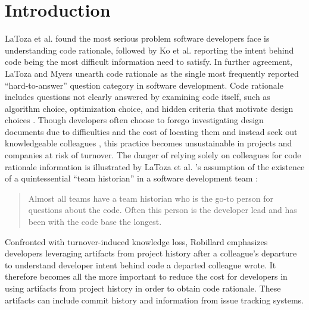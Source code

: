 
\chapter{Introduction}
\label{ch:Introduction}


LaToza et al. \cite{latoza_maintaining_2006} found the most serious problem software developers face is understanding code rationale, followed by Ko et al. \cite{ko_information_2007} reporting the intent behind code being the most difficult information need to satisfy. 
In further agreement, LaToza and Myers \cite{latoza_hard-answer_2010} unearth code rationale as the single most frequently reported “hard-to-answer” question category in software development. 
Code rationale includes questions not clearly answered by examining code itself, such as algorithm choice, optimization choice, and hidden criteria that motivate design choices \cite{latoza_hard-answer_2010}. 
Though developers often choose to forego investigating design documents due to difficulties and the cost of locating them and instead seek out knowledgeable colleagues \cite{latoza_maintaining_2006}, this practice becomes unsustainable in projects and companies at risk of turnover. 
The danger of relying solely on colleagues for code rationale information is illustrated by LaToza et al. 's assumption of the existence of a quintessential ``team historian'' in a software development team \cite{latoza_maintaining_2006}:

\begin{quote}
Almost all teams have a team historian who is the go-to person for questions about the
code. Often this person is the developer lead and has been with the code base the longest.
\end{quote}

Confronted with turnover-induced knowledge loss, Robillard \cite{robillard_turnover-induced_2021} emphasizes developers leveraging artifacts from project history after a colleague’s departure to understand developer intent behind code a departed colleague wrote. 
It therefore becomes all the more important to reduce the cost for developers in using artifacts from project history in order to obtain code rationale. These artifacts can include commit history and information from issue tracking systems.

